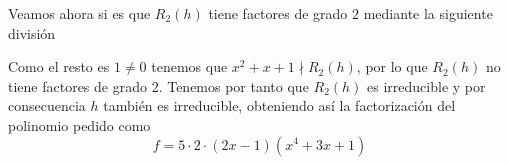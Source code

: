 \documentclass[12pt]{article}
\begin{document}
\begin{ejercicio}[1,25 puntos]
        Veamos ahora si es que $R_2(h)$ tiene factores de grado $2$ mediante la siguiente división
        \begin{center}
        \end{center}
        Como el resto es $1\neq0$ tenemos que $x^2+x+1 \nmid R_2(h)$, por lo que $R_2(h)$ no tiene factores de grado 2.
        Tenemos por tanto que $R_2(h)$ es irreducible y  por consecuencia $h$ también es irreducible, obteniendo así la factorización del polinomio pedido como
        \begin{equation*}
            f=5\cdot 2\cdot (2x-1)(x^4+3x+1)
        \end{equation*}
    \end{ejercicio}
\end{document}
